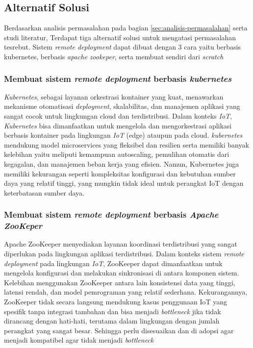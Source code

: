 \subsection{Alternatif Solusi}
\label{sec:analisis-solusi}

Berdasarkan analisis permasalahan pada bagian \ref{sec:analisis-permasalahan} serta studi literatur, Terdapat tiga alternatif solusi untuk mengatasi permasalahan tesrebut. Sistem \textit{remote deployment} dapat dibuat dengan 3 cara yaitu berbasis kubernetes, berbasis \textit{apache zookeper}, serta membuat sendiri dari \textit{scratch}

\subsubsection{Membuat sistem \textit{remote deployment} berbasis \textit{kubernetes}}
\textit{Kubernetes}, sebagai layanan orkestrasi kontainer yang kuat, menawarkan mekanisme otomatisasi \textit{deployment}, skalabilitas, dan manajemen aplikasi yang sangat cocok untuk lingkungan cloud dan terdistribusi. Dalam konteks \textit{IoT}, \textit{Kubernetes} bisa dimanfaatkan untuk mengelola dan mengorkestrasi aplikasi berbasis kontainer pada lingkungan \textit{IoT} (edge) ataupun pada cloud. \textit{kubernetes} mendukung model microservices yang fleksibel dan resilien serta memiliki banyak kelebihan yaitu  meliputi kemampuan autoscaling, pemulihan otomatis dari kegagalan, dan manajemen beban kerja yang efisien. Namun, Kubernetes juga memiliki kekurangan seperti kompleksitas konfigurasi dan kebutuhan sumber daya yang relatif tinggi, yang mungkin tidak ideal untuk perangkat IoT dengan keterbatasan sumber daya.

\subsubsection{Membuat sistem \textit{remote deployment} berbasis \textit{Apache ZooKeper}}
Apache ZooKeeper menyediakan layanan koordinasi terdistribusi yang sangat diperlukan pada lingkungan aplikasi terdistribusi. Dalam konteks sistem \textit{remote deployment} pada lingkungan \textit{IoT}, ZooKeeper dapat dimanfaatkan untuk mengelola konfigurasi dan melakukan sinkronisasi di antara komponen sistem. Kelebihan menggunakan ZooKeeper antara lain konsistensi data yang tinggi, latensi rendah, dan model pemrograman yang relatif sederhana. Kekurangannya, ZooKeeper tidak secara langsung mendukung kasus penggunaan IoT yang spesifik tanpa integrasi tambahan dan bisa menjadi \textit{bottleneck} jika tidak dirancang dengan hati-hati, terutama dalam lingkungan dengan jumlah perangkat yang sangat besar. Sehingga perlu disesuaikan dan di adopsi agar menjadi kompatibel agar tidak menjadi \textit{bottleneck}

